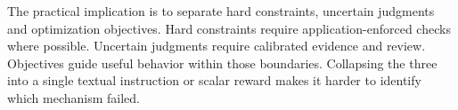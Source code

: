 The practical implication is to separate hard constraints, uncertain judgments and optimization objectives. Hard constraints require application-enforced checks where possible. Uncertain judgments require calibrated evidence and review. Objectives guide useful behavior within those boundaries. Collapsing the three into a single textual instruction or scalar reward makes it harder to identify which mechanism failed.

